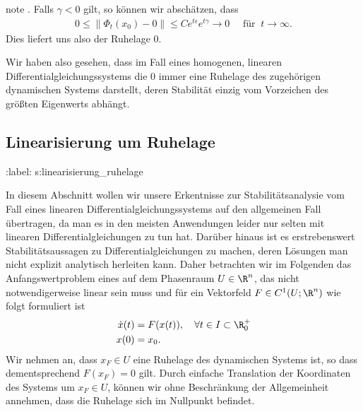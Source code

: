 \documentclass[letterpaper,10pt,english]{jupyterBook}
\begin{document}
\begin{sphinxadmonition}{note}
. Falls \(\gamma <0\) gilt, so können wir abschätzen, dass
\begin{equation*}
\begin{split}0\leq \|\Phi_t(x_0)-0\|\leq C e^{t\epsilon} e^{t \gamma} \to 0 \quad \text{ für } \ t \to \infty.\end{split}
\end{equation*}
\sphinxAtStartPar
Dies liefert uns also  der Ruhelage \(0\).
\end{sphinxadmonition}

\sphinxAtStartPar
Wir haben also gesehen, dass im Fall eines homogenen, linearen Differentialgleichungssystems die \(0\) immer eine Ruhelage des zugehörigen dynamischen Systems darstellt, deren Stabilität einzig vom Vorzeichen des größten Eigenwerts abhängt.


\subsection{Linearisierung um Ruhelage}
\label{\detokenize{ode_stability/ruhelagen:linearisierung-um-ruhelage}}
\sphinxAtStartPar
:label: s:linearisierung\_ruhelage

\sphinxAtStartPar
In diesem Abschnitt wollen wir unsere Erkentnisse zur Stabilitätsanalysie vom Fall eines linearen Differentialgleichungssystems auf den allgemeinen Fall übertragen, da man es in den meisten Anwendungen leider nur selten mit linearen Differentialgleichungen zu tun hat.
Darüber hinaus ist es erstrebenswert Stabilitätsaussagen zu Differentialgleichungen zu machen, deren Lösungen man nicht explizit analytisch herleiten kann.
Daher betrachten wir im Folgenden das Anfangswertproblem eines  auf dem Phasenraum \(U\in \R^n\), das nicht notwendigerweise linear sein muss und für ein Vektorfeld \(F\in C^1(U;\R^n)\) wie folgt formuliert ist
\begin{equation}\label{equation:ode_stability/ruhelagen:eq:awpallg}
\begin{split}\dot{x}(t) &= F(x(t)), \quad \forall t \in I \subset \R^+_0\\
x(0) &= x_0.\end{split}
\end{equation}
\sphinxAtStartPar
Wir nehmen an, dass \(x_F \in U\) eine Ruhelage des dynamischen Systems ist, so dass dementsprechend \(F(x_F) = 0\) gilt.
Durch einfache Translation der Koordinaten des Systems um \(x_F \in U\), können wir ohne Beschränkung der Allgemeinheit annehmen, dass die Ruhelage sich im Nullpunkt befindet.
\end{document}
